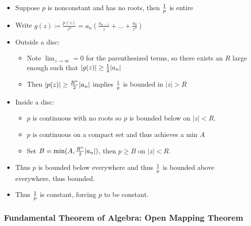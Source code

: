 \begin{itemize}
\tightlist
\item
  Suppose \(p\) is nonconstant and has no roots, then \({1\over p}\) is
  entire
\item
  Write
  \(g(z) \coloneqq\frac{p(z)}{z^{n}}=a_{n}\left(\frac{a_{n-1}}{z}+\dots+\frac{a_{0}}{z^{n}}\right)\)
\item
  Outside a disc:

  \begin{itemize}
  \tightlist
  \item
    Note \(\lim_{z\to \infty} = 0\) for the parenthesized terms, so
    there exists an \(R\) large enough such that
    \({\left\lvert {g(z)} \right\rvert} \geq {1\over 2} {\left\lvert {a_n} \right\rvert}\)
  \item
    Then
    \({\left\lvert {p(z)} \right\rvert} \geq {R^n\over 2} {\left\lvert {a_n} \right\rvert}\)
    implies \({1\over p}\) is bounded in
    \({\left\lvert {z} \right\rvert} > R\)
  \end{itemize}
\item
  Inside a disc:

  \begin{itemize}
  \tightlist
  \item
    \(p\) is continuous with no roots so \(p\) is bounded below on
    \({\left\lvert {z} \right\rvert} < R\).
  \item
    \(p\) is continuous on a compact set and thus achieves a min \(A\)
  \item
    Set \(B = \min(A, {R^n \over 2} {\left\lvert {a_n} \right\rvert})\),
    then \(p \geq B\) on \({\left\lvert {z} \right\rvert} < R\).
  \end{itemize}
\item
  Thus \(p\) is bounded below everywhere and thus \({1\over p}\) is
  bounded above everywhere, thus bounded.
\item
  Thus \({1\over p}\) is constant, forcing \(p\) to be constant.
\end{itemize}

\hypertarget{fundamental-theorem-of-algebra-open-mapping-theorem}{%
\subsubsection{Fundamental Theorem of Algebra: Open Mapping
Theorem}\label{fundamental-theorem-of-algebra-open-mapping-theorem}}

